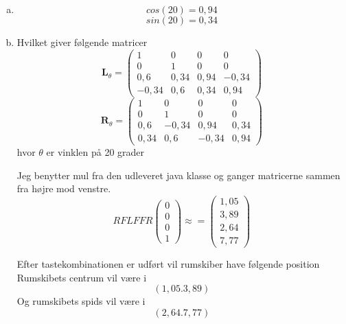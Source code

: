 \documentclass[12pt]{article}
\begin{document}
\begin{enumerate}[(a)]
\item
$$cos(20) = 0,94$$
$$sin(20) = 0,34$$

\item Hvilket giver følgende matricer
$$\mathbf{L}_\theta =
  \left(\begin{array}{cccc}
    1 & 0 & 0 & 0 \\
    0 & 1 & 0 & 0 \\
    0,6 & 0,34 & 0,94 & -0,34 \\
    -0,34 & 0,6 & 0,34 & 0,94
\end{array}\right)
$$$$
  \mathbf{R}_\theta =
  \left(\begin{array}{cccc}
    1 & 0 & 0 & 0 \\
    0 & 1 & 0 & 0 \\
    0,6 & -0,34 & 0,94 & 0,34 \\
    0,34 & 0,6 & -0,34 & 0,94
  \end{array}\right)
$$
hvor $\theta$ er vinklen på 20 grader

Jeg benytter mul fra den udleveret java klasse og ganger matricerne sammen fra
højre mod venstre.
$$RFLFFR\left(\begin{array}{c}
0\\
0\\
0\\
1
\end{array}\right) \approx =
\left(\begin{array}{c}
1,05\\
3,89\\
2,64\\
7,77
\end{array}\right)
$$

Efter tastekombinationen er udført vil rumskiber have følgende position
Rumskibets centrum vil være i 
$$(1,05. 3,89)$$
Og rumskibets spids vil være i
$$(2,64. 7,77)$$
\end{enumerate}
\end{document}
